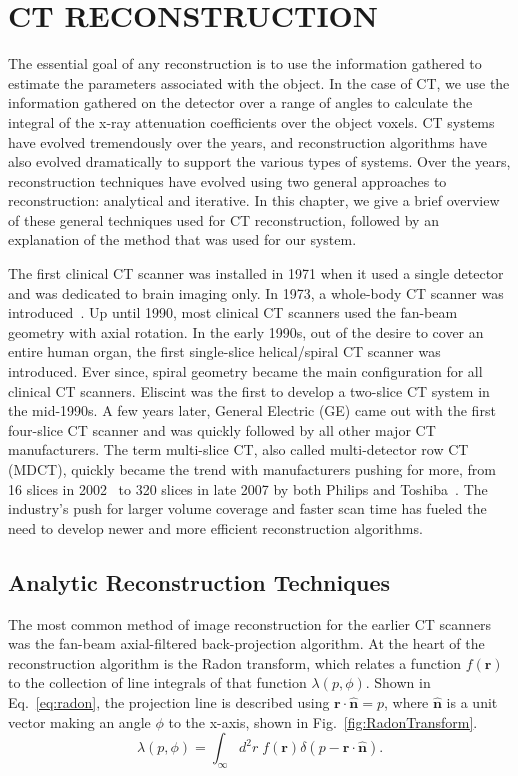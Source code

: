 \chapter{CT RECONSTRUCTION}
\label{chap:reconstruction}

The essential goal of any reconstruction is to use the information gathered to estimate the parameters associated with the object.  In the case of CT, we use the information gathered on the detector over a range of angles to calculate the integral of the x-ray attenuation coefficients over the object voxels.  CT systems have evolved tremendously over the years, and reconstruction algorithms have also evolved dramatically to support the various types of systems. Over the years, reconstruction techniques have evolved using two general approaches to reconstruction: analytical and iterative.  In this chapter, we give a brief overview of these general techniques used for CT reconstruction, followed by an explanation of the method that was used for our system.

The first clinical CT scanner was installed in 1971 when it used a single detector and was dedicated to brain imaging only.  In 1973, a whole-body CT scanner was introduced~\citep{Ulzheimer2009}.  Up until 1990, most clinical CT scanners used the fan-beam geometry with axial rotation.  In the early 1990s, out of the desire to cover an entire human organ, the first single-slice helical/spiral CT scanner was introduced.  Ever since, spiral geometry became the main configuration for all clinical CT scanners.  Eliscint was the first to develop a two-slice CT system in the mid-1990s.  A few years later, General Electric (GE) came out with the first four-slice CT scanner and was quickly followed by all other major CT manufacturers.  The term multi-slice CT, also called multi-detector row CT (MDCT), quickly became the trend with manufacturers pushing for more, from 16 slices in 2002~\citep{Impact2002} to 320 slices in late 2007 by both Philips and Toshiba~\citep{Ulzheimer2009}.  The industry's push for larger volume coverage and faster scan time has fueled the need to develop newer and more efficient reconstruction algorithms.

\section{Analytic Reconstruction Techniques}

The most common method of image reconstruction for the earlier CT scanners was the fan-beam axial-filtered back-projection algorithm.  At the heart of the reconstruction algorithm is the Radon transform, which relates a function $f(\mathbf{r})$ to the collection of line integrals of that function $\lambda(p, \phi)$.  Shown in Eq.~\ref{eq:radon}, the projection line is described using $\mathbf{r \cdot \hat{n}} = p$, where $\mathbf{\hat{n}}$ is a unit vector making an angle $\phi$ to the x-axis, shown in Fig.~\ref{fig:RadonTransform}.  
%
\begin{equation}
\lambda(p, \phi) = \int_\infty d^2r \; f(\mathbf{r}) \delta(p- \mathbf{r} \cdot \mathbf{\hat{n}}).
\label{eq:radon}
\end{equation}

